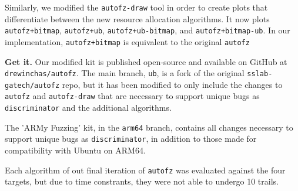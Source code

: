 Similarly, we modified the \texttt{autofz-draw} tool in order to create plots that 
differentiate between the new resource allocation algorithms. It now plots \texttt{autofz+bitmap}, 
\texttt{autofz+ub}, \texttt{autofz+ub-bitmap}, and \texttt{autofz+bitmap-ub}. In our 
implementation, \texttt{autofz+bitmap} is equivalent to the original \texttt{autofz}

\textbf{Get it.} Our modified kit is published open-source and available on GitHub at \texttt{drewinchas/autofz}\cite{york_drewinchasautofz_2024}. 
The main branch, \texttt{ub}, is a fork of the original \texttt{sslab-gatech/autofz}\cite{noauthor_sslab-gatechautofz_2024} 
repo, but it has been modified to only include the changes to \texttt{autofz} and \texttt{autofz-draw} 
that are necessary to support unique bugs as \texttt{discriminator} and the additional algorithms. 

The 'ARMy Fuzzing' kit, in the \texttt{arm64} branch\cite{noauthor_drewinchasautofz_nodate}, contains 
all changes necessary to support unique bugs as \texttt{discriminator}, in addition to those made for 
compatibility with Ubuntu on ARM64. 

Each algorithm of out final iteration of \texttt{autofz} was evaluated against the four targets, but due to time constrants, they
were not able to undergo 10 trails.